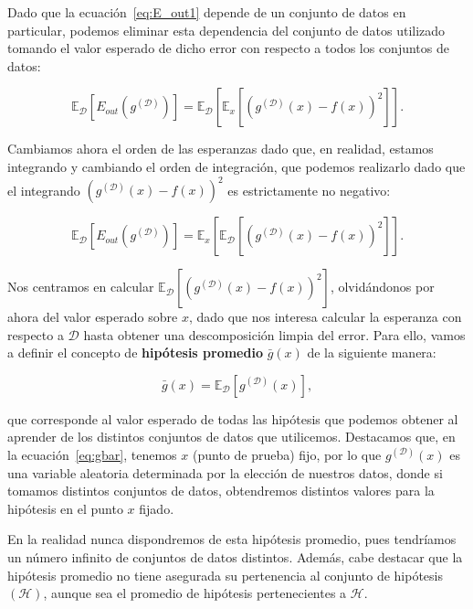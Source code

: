 Dado que la ecuación~\eqref{eq:E_out1} depende de un conjunto de datos en particular, podemos eliminar esta dependencia del conjunto de datos utilizado tomando el valor esperado de dicho error con respecto a todos los conjuntos de datos:

\begin{equation}\label{eq:E_out2}
    \mathbb{E}_{\mathcal{D}}[E_{out}(g^{\mathcal{(D)}})] = \mathbb{E}_{\mathcal{D}}[\mathbb{E}_{x}[{(g^{\mathcal{(D)}}(x) - f(x))}^2]]. 
\end{equation}

Cambiamos ahora el orden de las esperanzas dado que, en realidad, estamos integrando y cambiando el orden de integración, que podemos realizarlo dado que el integrando ${(g^{\mathcal{(D)}}(x) - f(x))}^2$ es estrictamente no negativo:

\begin{equation}\label{eq:E_out3}
    \mathbb{E}_{\mathcal{D}}[E_{out}(g^{\mathcal{(D)}})] = \mathbb{E}_{x}[\mathbb{E}_{\mathcal{D}}[{(g^{\mathcal{(D)}}(x) - f(x))}^2]].
\end{equation}

Nos centramos en calcular $\mathbb{E}_{\mathcal{D}}[{(g^{\mathcal{(D)}}(x) - f(x))}^2]$, olvidándonos por ahora del valor esperado sobre $x$, dado que nos interesa calcular la esperanza con respecto a $\mathcal{D}$ hasta obtener una descomposición limpia del error. Para ello, vamos a definir el concepto de \textbf{hipótesis promedio} $\bar{g}(x)$ de la siguiente manera:

\begin{equation}\label{eq:gbar}
    \bar{g}(x) = \mathbb{E}_{\mathcal{D}}[g^{\mathcal{(D)}}(x)],
\end{equation}

que corresponde al valor esperado de todas las hipótesis que podemos obtener al aprender de los distintos conjuntos de datos que utilicemos. Destacamos que, en la ecuación~\eqref{eq:gbar}, tenemos $x$ (punto de prueba) fijo, por lo que $g^{\mathcal{(D)}}(x)$ es una variable aleatoria determinada por la elección de nuestros datos, donde si tomamos distintos conjuntos de datos, obtendremos distintos valores para la hipótesis en el punto $x$ fijado. 

En la realidad nunca dispondremos de esta hipótesis promedio, pues tendríamos un número infinito de conjuntos de datos distintos. Además, cabe destacar que la hipótesis promedio no tiene asegurada su pertenencia al conjunto de hipótesis $\mathcal{(H)}$, aunque sea el promedio de hipótesis pertenecientes a $\mathcal{H}$.

